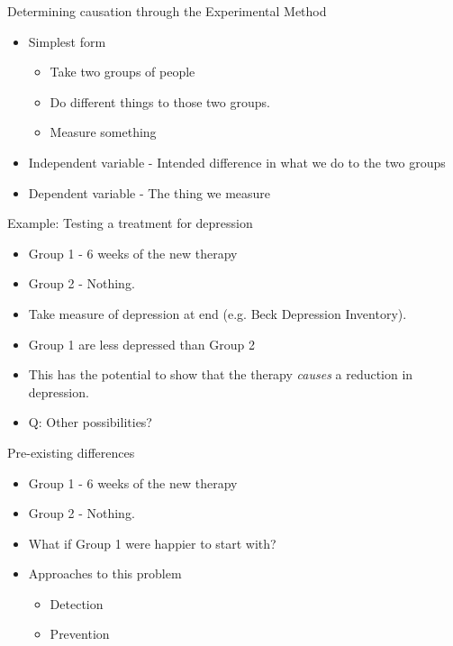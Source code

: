 \documentclass{beamer}
\begin{document}
\begin{frame}{Determining causation through the Experimental Method}
\begin{itemize}
\item Simplest form
\begin{itemize}
\item Take two groups of people
\item Do different things to those two groups.
\item Measure something
\end{itemize}
\vspace{12 pt}
\item Independent variable - Intended difference in what we do to the two groups
\item Dependent variable - The thing we measure
\end{itemize}
\end{frame}

\begin{frame}{Example: Testing a treatment for depression}
\begin{itemize}
\item Group 1 - 6 weeks of the new therapy
\item Group 2 - Nothing.
\item Take measure of depression at end (e.g. Beck Depression Inventory).
\item Group 1 are less depressed than Group 2
\vspace{12 pt}
\item This has the potential to show that the therapy \emph{causes} a reduction in depression.
\item Q: Other possibilities?
\end{itemize}
\end{frame}

\begin{frame}{Pre-existing differences}
\begin{itemize}
\item Group 1 - 6 weeks of the new therapy
\item Group 2 - Nothing.
\vspace{12 pt}
\item What if Group 1 were happier to start with?
\vspace{12 pt}
\item Approaches to this problem
\begin{itemize}
\item Detection
\item Prevention
\end{itemize}
\end{itemize}
\end{frame}
\end{document}
